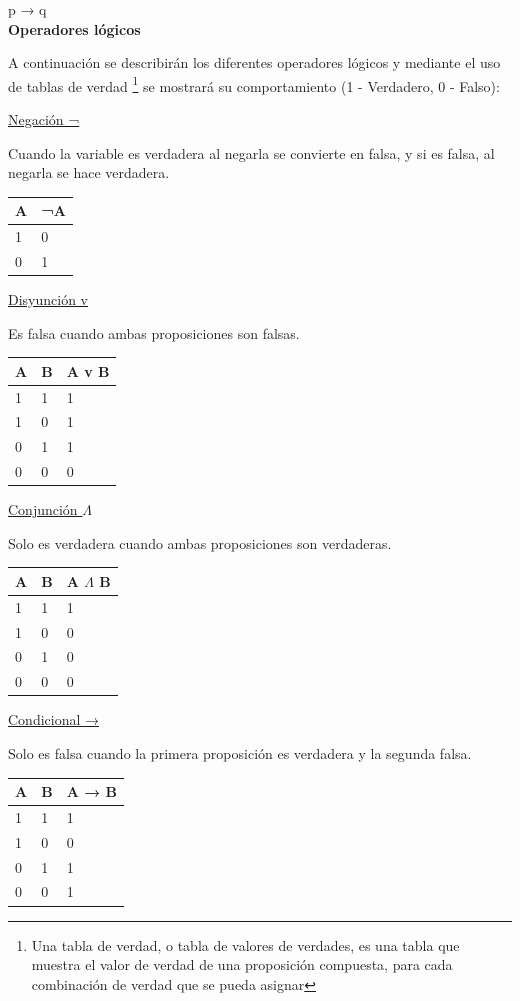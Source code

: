 \documentclass[11pt,fleqn]{book} %
\begin{document}
p → q\\

\textbf{Operadores lógicos}

A continuación se describirán los diferentes operadores lógicos y mediante el uso de tablas de verdad \footnote{ Una tabla de verdad, o tabla de valores de verdades, es una tabla que muestra el valor de verdad de una proposición compuesta, para cada combinación de verdad que se pueda asignar } se mostrará su comportamiento
(1 - Verdadero, 0 - Falso):

\clearpage
\underline{Negación ¬}

Cuando la variable es verdadera al negarla se convierte en falsa, y si es falsa, al negarla se hace verdadera.

\begin{tabular}{|l|l|}
\hline
	A &	¬A\\
\hline
	1 & 0\\
\hline
	0 & 1\\
\hline
\end{tabular}

\underline{Disyunción v}

Es falsa cuando ambas proposiciones son falsas.

\begin{tabular}{|l|l|l|}
\hline
	A	& B	& A v B\\
\hline
	1 & 1 & 1\\
\hline
	1 & 0 & 1\\
\hline
	0 & 1 & 1\\
\hline
	0 & 0 & 0\\
\hline
\end{tabular}

\underline{Conjunción $\Lambda$}

Solo es verdadera cuando ambas proposiciones son verdaderas.

\begin{tabular}{|l|l|l|}
\hline
	A	& B	& A $\Lambda$ B \\
\hline
	1 & 1 & 1\\
\hline
	1 & 0 & 0\\
\hline
	0 & 1 & 0\\
\hline
	0 & 0 & 0\\
\hline
\end{tabular}

\underline{Condicional →}

Solo es falsa cuando la primera proposición es verdadera y la segunda falsa.

\begin{tabular}{|l|l|l|}
\hline
	A	& B	& A → B \\
\hline
	1 & 1 & 1\\
\hline
	1 & 0 & 0\\
\hline
	0 & 1 & 1\\
\hline
	0 & 0 & 1\\
\hline
\end{tabular}
\end{document}
